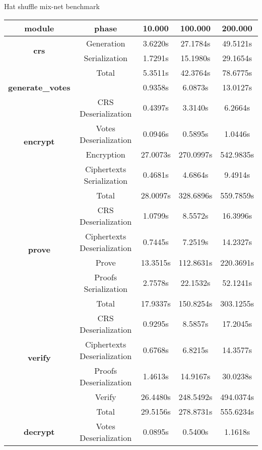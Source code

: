 \documentclass{standalone}
\begin{document}
\begin{threeparttable}
\caption{Hat shuffle mix-net benchmark}
\label{table:hatshuffle}
\begin{tabular}{c|c|ccc}
\hline
\textbf{module} & \textbf{phase} & \textbf{10.000} & \textbf{100.000} & \textbf{200.000} \\
\hline
\hline
\multirow{2}{*}{\textbf{crs}} & Generation & 3.6220s & 27.1784s & 49.5121s \\
& Serialization & 1.7291s & 15.1980s & 29.1654s \\
\hline
& Total & 5.3511s & 42.3764s & 78.6775s \\
\hline
\hline
\textbf{generate\_votes} & & 0.9358s & 6.0873s & 13.0127s \\
\hline
\hline
\multirow{4}{*}{\textbf{encrypt}} & CRS Deserialization & 0.4397s & 3.3140s & 6.2664s \\
& Votes Deserialization & 0.0946s & 0.5895s & 1.0446s \\
& Encryption & 27.0073s & 270.0997s & 542.9835s \\
& Ciphertexts Serialization & 0.4681s & 4.6864s & 9.4914s \\
\hline
& Total & 28.0097s & 328.6896s & 559.7859s \\
\hline
\hline
\multirow{4}{*}{\textbf{prove}} & CRS Deserialization & 1.0799s & 8.5572s & 16.3996s \\
& Ciphertexts Deserialization & 0.7445s & 7.2519s & 14.2327s \\
& Prove & 13.3515s & 112.8631s & 220.3691s \\
& Proofs Serialization & 2.7578s & 22.1532s & 52.1241s \\
\hline
& Total & 17.9337s & 150.8254s & 303.1255s \\
\hline
\hline
\multirow{4}{*}{\textbf{verify}} & CRS Deserialization & 0.9295s & 8.5857s & 17.2045s \\
& Ciphertexts Deserialization & 0.6768s & 6.8215s & 14.3577s \\
& Proofs Deserialization & 1.4613s & 14.9167s & 30.0238s \\
& Verify & 26.4480s & 248.5492s & 494.0374s \\
\hline
& Total & 29.5156s & 278.8731s & 555.6234s \\
\hline
\hline
\multirow{5}{*}{\textbf{decrypt}} & Votes Deserialization & 0.0895s & 0.5400s & 1.1618s \\

\end{tabular}
\end{threeparttable}
\end{document}
